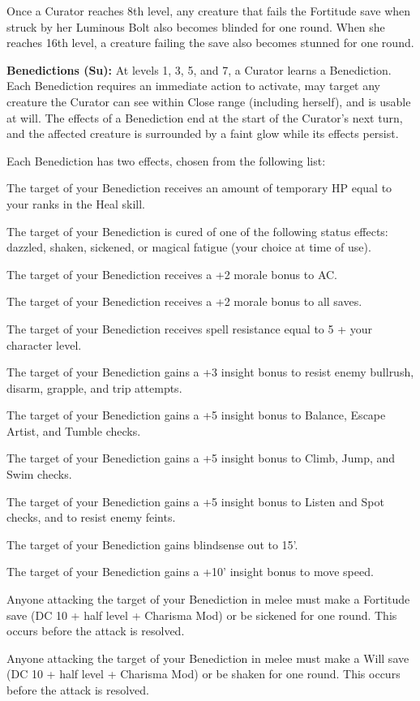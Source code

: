 Once a Curator reaches 8th level, any creature that fails the Fortitude save when struck by her Luminous Bolt also becomes blinded for one round. When she reaches 16th level, a creature failing the save also becomes stunned for one round.

\textbf{Benedictions (Su):} At levels 1, 3, 5, and 7, a Curator learns a Benediction. Each Benediction requires an immediate action to activate, may target any creature the Curator can see within Close range (including herself), and is usable at will. The effects of a Benediction end at the start of the Curator's next turn, and the affected creature is surrounded by a faint glow while its effects persist.

Each Benediction has two effects, chosen from the following list:
\begin{itemize*}
\item The target of your Benediction receives an amount of temporary HP equal to your ranks in the Heal skill.
\item The target of your Benediction is cured of one of the following status effects: dazzled, shaken, sickened, or magical fatigue (your choice at time of use).
\item The target of your Benediction receives a +2 morale bonus to AC.
\item The target of your Benediction receives a +2 morale bonus to all saves.
\item The target of your Benediction receives spell resistance equal to 5 + your character level.
\item The target of your Benediction gains a +3 insight bonus to resist enemy bullrush, disarm, grapple, and trip attempts.
\item The target of your Benediction gains a +5 insight bonus to Balance, Escape Artist, and Tumble checks.
\item The target of your Benediction gains a +5 insight bonus to Climb, Jump, and Swim checks.
\item The target of your Benediction gains a +5 insight bonus to Listen and Spot checks, and to resist enemy feints.
\item The target of your Benediction gains blindsense out to 15'.
\item The target of your Benediction gains a +10' insight bonus to move speed.
\item Anyone attacking the target of your Benediction in melee must make a Fortitude save (DC 10 + half level + Charisma Mod) or be sickened for one round. This occurs before the attack is resolved.
\item Anyone attacking the target of your Benediction in melee must make a Will save (DC 10 + half level + Charisma Mod) or be shaken for one round. This occurs before the attack is resolved.
\end{itemize*}

